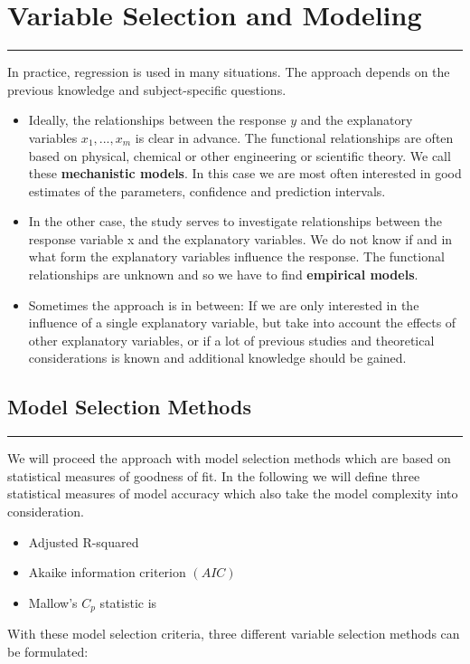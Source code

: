 \section{Variable Selection and Modeling}
\noindent\rule[\linienAbstand]{\linewidth}{\linienDickeDick}

In practice, regression is used in many situations. The approach depends on the previous knowledge and subject-specific questions.\\
\begin{itemize}
  \item Ideally, the relationships between the response $y$ and the explanatory variables $x_1, ..., x_m$  is clear in advance. The functional relationships are often based on physical, chemical or other engineering or scientific theory. We call these \textbf{mechanistic models}. In this case we are most often interested in good estimates of the parameters, confidence and prediction intervals.
  \item  In the other case, the study serves to investigate relationships between the response variable x and the explanatory variables. We do not know if and in what form the explanatory variables influence the response. The functional relationships are unknown and so we have to find \textbf{empirical models}.
  \item Sometimes the approach is in between: If we are only interested in the influence of a single explanatory variable, but take into account the effects of other explanatory variables, or if a lot of previous studies and theoretical considerations is known and additional knowledge should be gained.
\end{itemize}

\subsection{Model Selection Methods}
\noindent\rule[\linienAbstand]{\linewidth}{\linienDicke}
We will proceed the approach with model selection methods which are based on statistical measures of goodness of fit.
In the following we will define three statistical measures of model accuracy which also take the model complexity into consideration.
\begin{itemize}
  \item Adjusted R-squared
  \item Akaike information criterion $(AIC)$
  \item Mallow’s $C_p$ statistic is
\end{itemize}
With these model selection criteria, three different variable selection methods can be formulated:

